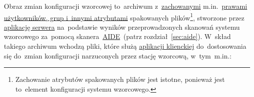 \documentclass[thesis]{subfiles}
\begin{document}
Obraz zmian konfiguracji wzorcowej to~archiwum  z~\href{https://unix.stackexchange.com/questions/43605/how-do-i-copy-a-folder-keeping-owners-and-permissions-intact}{zachowanymi} m.in.~\href{https://wiki.archlinux.org/index.php/File_permissions_and_attributes}{prawami użytkowników, grup i~innymi atrybutami} spakowanych plików\footnote{Zachowanie atrybutów spakowanych plików jest istotne, ponieważ jest to~element konfiguracji systemu wzorcowego.}, stworzone przez \hyperref[sec:srv-app]{aplikację serwera} na~podstawie wyników przeprowadzonych skanowań systemu wzorcowego za~pomocą skanera~\hyperref[sec:aide]{AIDE}~(patrz rozdział~\ref{sec:aide}). W~skład takiego archiwum wchodzą pliki, które służą \hyperref[sec:cli-app]{aplikacji klienckiej} do~dostosowania się do~zmian konfiguracji narzuconych przez stację wzorcową, w~tym~m.in.:\mynobreakpar
\end{document}
